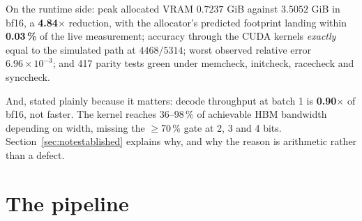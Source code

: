 \documentclass[11pt]{article}
\newcommand{\x}{$\times$}
\newcommand{\pct}{\,\%}
\begin{document}
On the runtime side: peak allocated VRAM $0.7237$ GiB against $3.5052$ GiB in bf16, a
\textbf{4.84\x} reduction, with the allocator's predicted footprint landing within
\textbf{0.03\pct} of the live measurement; accuracy through the CUDA kernels
\emph{exactly} equal to the simulated path at $4468/5314$; worst observed relative error
$6.96\times10^{-3}$; and 417 parity tests green under memcheck, initcheck, racecheck and
synccheck.

And, stated plainly because it matters: decode throughput at batch 1 is
\textbf{0.90\x} of bf16, not faster. The kernel reaches 36--98\pct{} of achievable HBM bandwidth
depending on width, missing the $\ge$70\pct{} gate at 2, 3 and 4 bits.
Section~\ref{sec:notestablished} explains why, and why the reason is arithmetic rather than a
defect.

\newpage
\section{The pipeline}
\end{document}
